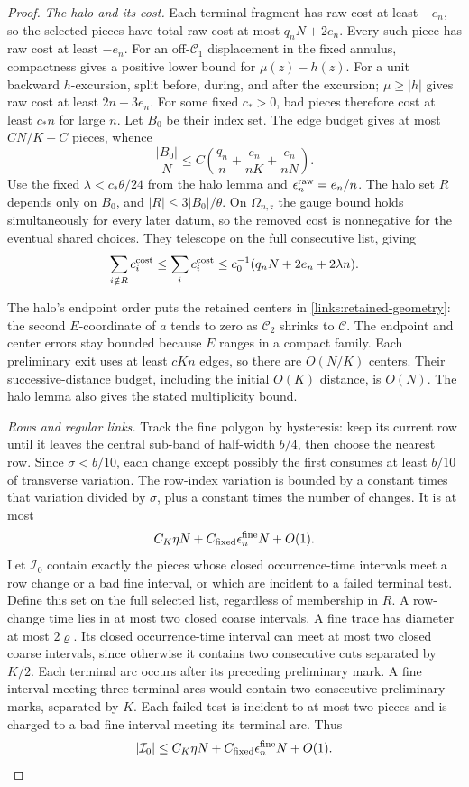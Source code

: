 \begin{proof}
\emph{The halo and its cost.}
Each terminal fragment has raw cost at least \(-e_n\), so the selected
pieces have total raw cost at most \(q_nN+2e_n\). Every such piece has
raw cost at least \(-e_n\). For an off-\(\mathcal C_1\) displacement
in the fixed annulus, compactness gives a positive lower bound for
\(\mu(z)-h(z)\). For a unit backward \(h\)-excursion, split before,
during, and after the excursion; \(\mu\ge|h|\) gives raw cost at least
\(2n-3e_n\). For some fixed \(c_*>0\), bad pieces therefore cost at
least \(c_*n\) for large \(n\). Let \(B_0\) be their index set.
The edge budget gives at most \(CN/K+C\) pieces, whence
\[
 \frac{|B_0|}{N}
 \le C\left(\frac{q_n}{n}+\frac{e_n}{nK}
                         +\frac{e_n}{nN}\right).
\]
Use the fixed \(\lambda<c_*\theta/24\) from the halo lemma and
\(\epsilon_n^{\rm raw}=e_n/n\). The halo set \(R\) depends only on
\(B_0\), and \(|R|\le3|B_0|/\theta\). On \(\Omega_{n,\mathfrak r}\)
the gauge bound holds simultaneously for every later datum, so the
removed cost is nonnegative for the eventual shared choices. They
telescope on the full consecutive list, giving
\[
 \sum_{i\notin R}c_i^{\rm cost}
 \le\sum_i c_i^{\rm cost}
 \le c_0^{-1}(q_nN+2e_n+2\lambda n).
\]

The halo's endpoint order puts the retained centers in
\eqref{links:retained-geometry}: the second \(E\)-coordinate of \(a\)
tends to zero as \(\mathcal C_2\) shrinks to \(\mathcal C\).
The endpoint and center errors stay bounded because \(E\) ranges in a
compact family. Each preliminary exit uses at least \(cKn\) edges,
so there are \(O(N/K)\) centers. Their successive-distance budget,
including the initial \(O(K)\) distance, is \(O(N)\). The halo lemma
also gives the stated multiplicity bound.

\emph{Rows and regular links.}
Track the fine polygon by hysteresis: keep its current row until it
leaves the central sub-band of half-width \(b/4\), then choose the
nearest row. Since \(\sigma<b/10\), each change except possibly the
first consumes at least \(b/10\) of transverse variation. The row-index
variation is bounded by a constant times that variation divided by
\(\sigma\), plus a constant times the number of changes. It is at most
\[
 C_K\eta N+C_{\rm fixed}\epsilon_n^{\rm fine}N+O(1).
\]
Let \(\mathcal I_0\) contain exactly the pieces whose closed
occurrence-time intervals meet a row change or a bad fine interval,
or which are incident to a failed terminal test. Define this set on
the full selected list, regardless of membership in \(R\).
A row-change time lies in at most two closed coarse intervals.
A fine trace has diameter
at most \(2\varrho\). Its closed occurrence-time interval can meet at most
two closed coarse intervals, since otherwise it contains two consecutive cuts
separated by \(K/2\). Each terminal arc occurs after its preceding
preliminary mark. A fine interval meeting three terminal arcs would
contain two consecutive preliminary marks, separated by \(K\).
Each failed test is incident to at most two pieces and is charged to a
bad fine interval meeting its terminal arc. Thus
\[
 |\mathcal I_0|
 \le C_K\eta N+C_{\rm fixed}\epsilon_n^{\rm fine}N+O(1).
\]


\end{proof}

